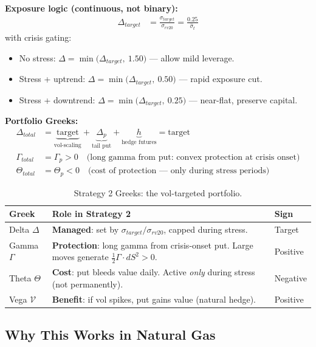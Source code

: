 \documentclass[11pt,a4paper]{article}
\begin{document}
\textbf{Exposure logic (continuous, not binary):}
\begin{align}
\Delta_{target} &= \frac{\sigma_{target}}{\sigma_{rv20}} = \frac{0.25}{\hat{\sigma}_t} \label{eq:voltarget}
\end{align}
with crisis gating:
\begin{itemize}[nosep]
\item No stress: $\Delta = \min\bigl(\Delta_{target},\ 1.50\bigr)$ --- allow mild leverage.
\item Stress + uptrend: $\Delta = \min\bigl(\Delta_{target},\ 0.50\bigr)$ --- rapid exposure cut.
\item Stress + downtrend: $\Delta = \min\bigl(\Delta_{target},\ 0.25\bigr)$ --- near-flat, preserve capital.
\end{itemize}

\textbf{Portfolio Greeks:}
\begin{align}
\Delta_{total} &= \underbrace{\text{target}}_{\text{vol-scaling}} + \underbrace{\Delta_p}_{\text{tail put}} + \underbrace{h}_{\text{hedge futures}} = \text{target} \\
\Gamma_{total} &= \Gamma_p > 0 \quad \text{(long gamma from put: convex protection at crisis onset)} \nonumber \\
\Theta_{total} &= \Theta_p < 0 \quad \text{(cost of protection --- only during stress periods)} \nonumber
\end{align}

\begin{table}[H]
\centering
\caption{Strategy 2 Greeks: the vol-targeted portfolio.}
\begin{tabularx}{\textwidth}{lXl}
\toprule
Greek & Role in Strategy 2 & Sign \\
\midrule
Delta $\Delta$ & \textbf{Managed}: set by $\sigma_{target}/\sigma_{rv20}$, capped during stress. & Target \\
Gamma $\Gamma$ & \textbf{Protection}: long gamma from crisis-onset put. Large moves generate $\frac{1}{2}\Gamma \cdot dS^2 > 0$. & Positive \\
Theta $\Theta$ & \textbf{Cost}: put bleeds value daily. Active \emph{only} during stress (not permanently). & Negative \\
Vega $\mathcal{V}$ & \textbf{Benefit}: if vol spikes, put gains value (natural hedge). & Positive \\
\bottomrule
\end{tabularx}
\end{table}

\subsection{Why This Works in Natural Gas}
\end{document}
